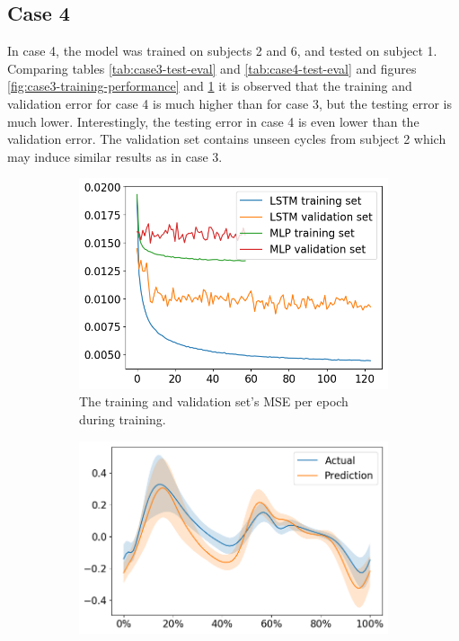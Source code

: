 \documentclass[../main.tex]{subfiles}
\begin{document}


\subsection{Case 4}
\label{sec:results-case4}
In case 4, the model was trained on subjects 2 and 6, and tested on subject 1.
Comparing tables \ref{tab:case3-test-eval} and \ref{tab:case4-test-eval} and figures \ref{fig:case3-training-performance} and \ref{fig:case4-training-performance} it is observed that the training and validation error for case 4 is much higher than for case 3, but the testing error is much lower.
Interestingly, the testing error in case 4 is even lower than the validation error.
The validation set contains unseen cycles from subject 2 which may induce similar results as in case 3.
\begin{figure}[!htb]
     \centering
     \begin{subfigure}[b]{0.475\textwidth}
         \centering
         \includegraphics[width=\textwidth]{img/results/training_history/Case4_LSTMvsMLP_training.png}
         \caption{The training and validation set's \ac{MSE} per epoch during training.}
         \label{fig:case4-training-performance}
     \end{subfigure}
     \hfill
     \begin{subfigure}[b]{0.515\textwidth}
         \centering
         \includegraphics[width=\textwidth]{img/results/test_prediction_evaluation/Case4_LSTM_test_prediction.png}

\end{subfigure}
\end{figure}
\end{document}
